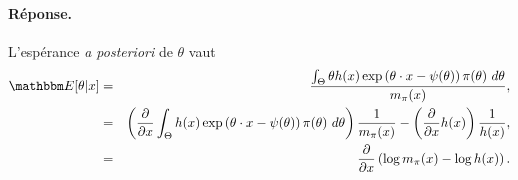 \paragraph{\bf Réponse.} L'espérance {\it a posteriori} de $\theta$ vaut
\begin{eqnarray*}
\E[\theta|x] & = & \frac{\int_{\Theta} \theta  h(x)\exp\left(\theta\cdot x - \psi(\theta)\right) \pi(\theta) \ d\theta}{m_{\pi}(x)}, \\
& = & \left(\frac{\partial }{\partial x} \int_{\Theta} h(x)\exp\left(\theta\cdot x - \psi(\theta)\right) \pi(\theta) \ d\theta\right) \frac{1}{m_{\pi}(x)} - \left(\frac{\partial }{\partial x}  h(x)\right) \frac{1}{h(x)}, \\
&= & \frac{\partial }{\partial x} \left( \log m_{\pi}(x) - \log h(x)\right).
\end{eqnarray*}



%
%